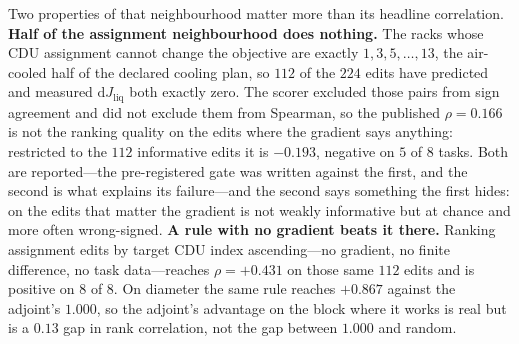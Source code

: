 \documentclass{article}
\newcommand{\Jliq}{J_{\mathrm{liq}}}
\begin{document}
Two properties of that neighbourhood matter more than its headline correlation.
\textbf{Half of the assignment neighbourhood does nothing.}  The racks whose CDU
assignment cannot change the objective are exactly $1,3,5,\dots,13$, the air-cooled half
of the declared cooling plan, so $112$ of the $224$ edits have predicted and measured
$\mathrm{d}\Jliq$ both exactly zero.  The scorer excluded those pairs from sign agreement
and did not exclude them from Spearman, so the published $\rho = 0.166$ is not the ranking
quality on the edits where the gradient says anything: restricted to the $112$ informative
edits it is $\mathbf{-0.193}$, negative on $5$ of $8$ tasks.  Both are reported---the
pre-registered gate was written against the first, and the second is what explains its
failure---and the second says something the first hides: on the edits that matter the
gradient is not weakly informative but at chance and more often wrong-signed.
\textbf{A rule with no gradient beats it there.}  Ranking assignment edits by target CDU
index ascending---no gradient, no finite difference, no task data---reaches
$\rho = +0.431$ on those same $112$ edits and is positive on $8$ of $8$.  On diameter the
same rule reaches $+0.867$ against the adjoint's $1.000$, so the adjoint's advantage on
the block where it works is real but is a $0.13$ gap in rank correlation, not the gap
between $1.000$ and random.
\end{document}
